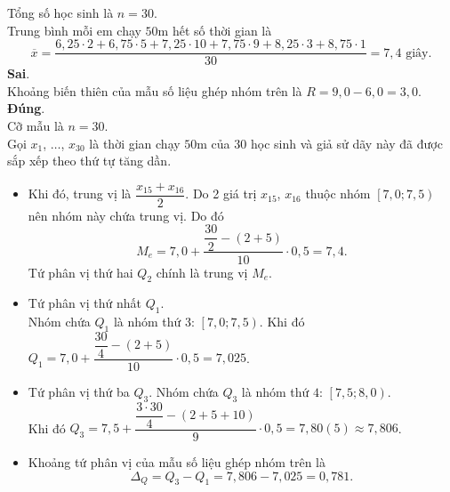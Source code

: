 \begin{ex}
{\begin{itemchoice}
		Tổng số học sinh là $n=30$.\\
		Trung bình mỗi em chạy $50$m hết số thời gian là
		\[\overline{x}
		=\dfrac{6{,}25\cdot 2+6{,}75\cdot 5+7{,}25\cdot 10+7{,}75\cdot 9+8{,}25\cdot 3+8{,}75\cdot 1}{30}
		=7{,}4\text{ giây}.\]
		\itemch \textbf{Sai}.\\
		Khoảng biến thiên của mẫu số liệu ghép nhóm trên là $R=9{,}0-6{,}0=3{,}0$.
		\itemch \textbf{Đúng}.\\
		Cỡ mẫu là $n=30$.\\
		Gọi $x_1$, $\ldots$, $x_{30}$ là thời gian chạy $50$m của $30$ học sinh và giả sử dãy này đã được sắp xếp theo thứ tự tăng dần.
		\begin{itemize}
			\item Khi đó, trung vị là $\dfrac{x_{15}+x_{16}}{2}$. Do 2 giá trị $x_{15}$, $x_{16}$ thuộc nhóm $\left[7{,}0;7{,}5 \right)$ nên nhóm này chứa trung vị. Do đó
			\[M_e=7{,}0+\dfrac{\dfrac{30}{2}-(2+5)}{10}\cdot 0{,}5=7{,}4.\]
			Tứ phân vị thứ hai $Q_2$ chính là trung vị $M_e$.
			\item Tứ phân vị thứ nhất $Q_1$.\\
			Nhóm chứa $Q_1$ là nhóm thứ $3$: $\left[ 7{,}0;7{,}5 \right)$. Khi đó $Q_1=7{,}0+\dfrac{\dfrac{30}{4}-\left(2+5 \right)}{10}\cdot 0{,}5=7{,}025$.
			\item Tứ phân vị thứ ba $Q_3$.
			Nhóm chứa $Q_3$ là nhóm thứ $4$: $\left[ 7{,}5;8{,}0 \right)$.\\
			Khi đó $Q_3=7{,}5+\dfrac{\dfrac{3\cdot 30}{4}-\left(2+5+10 \right)}{9}\cdot 0{,}5
			=7{,}80\left(5 \right)\approx 7{,}806$.
			\item Khoảng tứ phân vị của mẫu số liệu ghép nhóm trên là \[\Delta_Q=Q_3-Q_1=7{,}806-7{,}025=0{,}781.\]
		\end{itemize}
	\end{itemchoice}
}
\end{ex}

